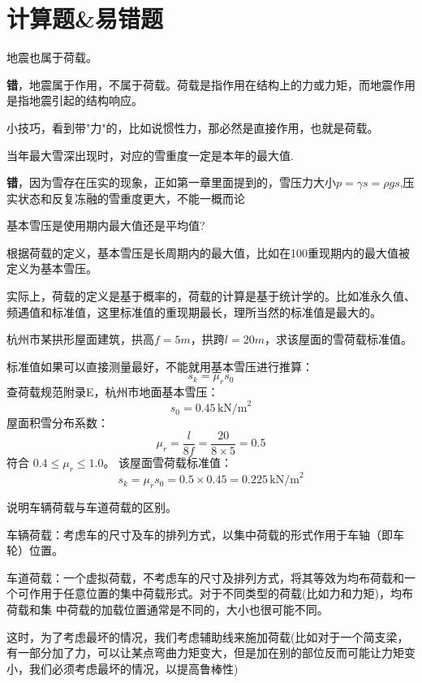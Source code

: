 \documentclass[12pt, a4paper, oneside, UTF8]{ctexbook}
\begin{document}
% 
\else
\fi

\chapter{计算题\&易错题}

\begin{example}
    地震也属于荷载。

    \textbf{错}，地震属于作用，不属于荷载。荷载是指作用在结构上的力或力矩，而地震作用是指地震引起的结构响应。{\color{red}{换句话说，狭义上，荷载必须是直接作用。}}

    小技巧，看到带"力"的，比如说惯性力，那必然是直接作用，也就是荷载。
\end{example}

\begin{example}
    当年最大雪深出现时，对应的雪重度一定是本年的最大值.

    \textbf{错}，因为雪存在压实的现象，正如第一章里面提到的，雪压力大小$p=\gamma s = \rho g s$,压实状态和反复冻融的雪重度更大，不能一概而论
\end{example}

\begin{example}
    基本雪压是使用期内最大值还是平均值?

    根据荷载的定义，基本雪压是长周期内的最大值，比如在100重现期内的最大值被定义为基本雪压。

    实际上，荷载的定义是基于概率的，荷载的计算是基于统计学的。比如准永久值、频遇值和标准值，这里标准值的重现期最长，理所当然的标准值是最大的。

\end{example}

\begin{example}
    杭州市某拱形屋面建筑，拱高\(f=5m\)，拱跨\(l=20m\)，求该屋面的雪荷载标准值。

    标准值如果可以直接测量最好，不能就用基本雪压进行推算：
    \[
    s_k = \mu_r s_0
    \]
    查荷载规范附录E，杭州市地面基本雪压：
    \[
    s_0 = 0.45\,\mathrm{kN/m}^2
    \]
    屋面积雪分布系数：
    \[
    \mu_r = \frac{l}{8f} = \frac{20}{8 \times 5} = 0.5
    \]
    符合 \(0.4 \leq \mu_r \leq 1.0\)。
    该屋面雪荷载标准值：
    \[
    s_k = \mu_r s_0 = 0.5 \times 0.45 = 0.225\,\mathrm{kN/m}^2
    \]
\end{example}

\begin{example}
    说明车辆荷载与车道荷载的区别。

车辆荷载：考虑车的尺寸及车的排列方式，以集中荷载的形式作用于车轴（即车轮）位置。

车道荷载：一个虚拟荷载，不考虑车的尺寸及排列方式，将其等效为均布荷载和一个可作用于任意位置的集中荷载形式。对于不同类型的荷载(比如力和力矩)，均布荷载和集
中荷载的加载位置通常是不同的，大小也很可能不同。

这时，为了考虑最坏的情况，我们考虑辅助线来施加荷载(比如对于一个简支梁，有一部分加了力，可以让某点弯曲力矩变大，但是加在别的部位反而可能让力矩变小，我们必须考虑最坏的情况，以提高鲁棒性)
\end{example}
\end{document}
